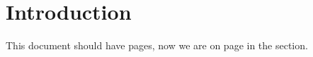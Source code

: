 \documentclass{article}
\begin{document}
\section{Introduction}
This document should have 
pages, now we are on page 
in the  section.
\end{document}
